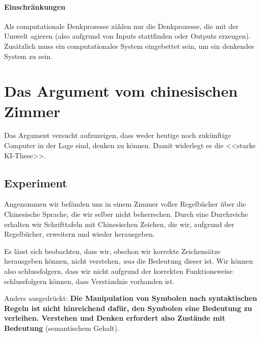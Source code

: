 \documentclass[../main.tex]{subfiles}
\begin{document}
\paragraph{Einschränkungen} Als computationale Denkprozesse zählen nur die Denkprozesse, die mit der Umwelt agieren (also aufgrund von Inputs stattfinden oder Outputs erzeugen). Zusätzlich muss ein computationales System eingebettet sein, um ein denkendes System zu sein. 

\section{Das Argument vom chinesischen Zimmer}  
Das Argument versucht aufzuzeigen, dass weder heutige noch zukünftige Computer in der Lage sind, denken zu können. Damit widerlegt es die <<starke KI-These>>. 
\subsection{Experiment}
Angenommen wir befänden uns in einem Zimmer voller Regelbücher über die Chinesische Sprache, die wir selber nicht beherrschen. Durch eine Durchreiche erhalten wir Schrifttafeln mit Chinesischen Zeichen, die wir, aufgrund der Regelbücher, erweitern und wieder herausgeben. 

Es lässt sich beobachten, dass wir, obschon wir korrekte Zeichensätze herausgeben können, nicht verstehen, \textit{was} die Bedeutung dieser ist. Wir können also schlussfolgern, dass wir nicht aufgrund der korrekten Funktionsweise schlussfolgern können, dass Verständnis vorhanden ist. 

Anders ausgedrückt: \textbf{Die Manipulation von Symbolen nach syntaktischen Regeln ist nicht hinreichend dafür, den Symbolen eine Bedeutung zu verleihen. Verstehen und Denken erfordert also Zustände mit Bedeutung} (semantischem Gehalt).
\end{document}
